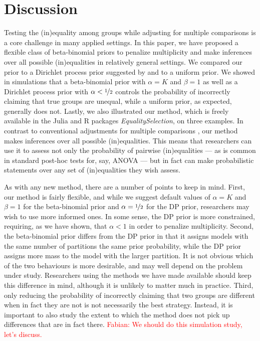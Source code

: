 \documentclass[11pt,a4paper]{article}
\theoremstyle{definition} %
\theoremstyle{case}
\newcommand{\FD}[1]{\textcolor{red}{Fabian: #1 }}
\begin{document}
\section{Discussion} \label{sec:discussion}
Testing the (in)equality among groups while adjusting for multiple comparisons is a core challenge in many applied settings. In this paper, we have proposed a flexible class of beta-binomial priors to penalize multiplicity and make inferences over all possible (in)equalities in relatively general settings. We compared our prior to a Dirichlet process prior suggested by \textcite{gopalan1998bayesian} and to a uniform prior. We showed in simulations that a beta-binomial prior with $\alpha = K$ and $\beta = 1$ as well as a Dirichlet process prior with $\alpha < \nicefrac{1}{2}$ controls the probability of incorrectly claiming that true groups are unequal, while a uniform prior, as expected, generally does not. Lastly, we also illustrated our method, which is freely available in the Julia and R packages \textit{EqualitySelection}, on three examples. In contrast to conventional adjustments for multiple comparisons \parencite[e.g.,][]{westfall1997bayesian, jeffreys1961theory}, our method makes inferences over all possible (in)equalities. This means that researchers can use it to assess not only the probability of pairwise (in)equalities --- as is common in standard post-hoc tests for, say, ANOVA --- but in fact can make probabilistic statements over any set of (in)equalities they wish assess.

As with any new method, there are a number of points to keep in mind. First, our method is fairly flexible, and while we suggest default values of $\alpha = K$ and $\beta = 1$ for the beta-binomial prior and $\alpha = \nicefrac{1}{2}$ for the DP prior, researchers may wish to use more informed ones. In some sense, the DP prior is more constrained, requiring, as we have shown, that $\alpha < 1$ in order to penalize multiplicity. Second, the beta-binomial prior differs from the DP prior in that it assigns models with the same number of partitions the same prior probability, while the DP prior assigns more mass to the model with the larger partition. It is not obvious which of the two behaviours is more desirable, and may well depend on the problem under study. Researchers using the methods we have made available should keep this difference in mind, although it is unlikely to matter much in practice. Third, only reducing the probability of incorrectly claiming that two groups are different when in fact they are not is not necessarily the best strategy. Instead, it is important to also study the extent to which the method does not pick up differences that are in fact there. \FD{We should do this simulation study, let's discuss.}
\end{document}
